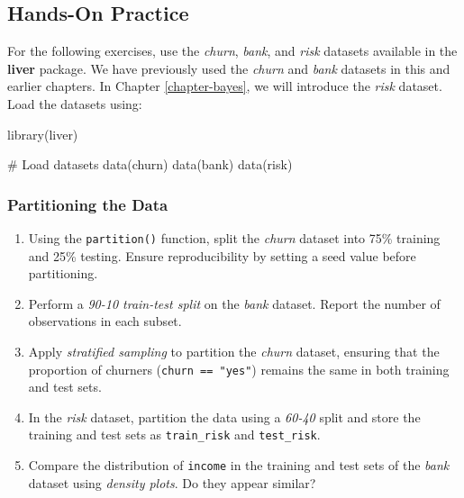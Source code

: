 \documentclass[
  11pt,
]{book}
\makeatletter
\newenvironment{Shaded}{}{}
\newcommand{\CommentTok}[1]{\textcolor[rgb]{0.36,0.36,0.36}{#1}}
\newcommand{\FunctionTok}[1]{#1}
\newcommand{\NormalTok}[1]{#1}
\newenvironment{kframe}{%
\medskip{}
\setlength{\fboxsep}{.8em}
 \def\at@end@of@kframe{}%
 \ifinner\ifhmode%
  \def\at@end@of@kframe{\end{minipage}}%
  \begin{minipage}{\columnwidth}%
 \fi\fi%
 \def\FrameCommand##1{\hskip\@totalleftmargin \hskip-\fboxsep
 \colorbox{shadecolor}{##1}\hskip-\fboxsep
     \hskip-\linewidth \hskip-\@totalleftmargin \hskip\columnwidth}%
 \MakeFramed {\advance\hsize-\width
   \@totalleftmargin\z@ \linewidth\hsize
   \@setminipage}}%
 {\par\unskip\endMakeFramed%
 \at@end@of@kframe}
\renewenvironment{Shaded}{\begin{kframe}}{\end{kframe}}
\theoremstyle{definition}
\theoremstyle{definition}
\theoremstyle{definition}
\theoremstyle{definition}
\theoremstyle{remark}
\makeatother
\begin{document}
\subsection*{Hands-On Practice}\label{hands-on-practice}


For the following exercises, use the \emph{churn}, \emph{bank}, and \emph{risk} datasets available in the \textbf{liver} package. We have previously used the \emph{churn} and \emph{bank} datasets in this and earlier chapters. In Chapter \ref{chapter-bayes}, we will introduce the \emph{risk} dataset. Load the datasets using:

\begin{Shaded}
\begin{Highlighting}[]
\FunctionTok{library}\NormalTok{(liver)}

\CommentTok{\# Load datasets}
\FunctionTok{data}\NormalTok{(churn)}
\FunctionTok{data}\NormalTok{(bank)}
\FunctionTok{data}\NormalTok{(risk)}
\end{Highlighting}
\end{Shaded}

\subsubsection*{Partitioning the Data}\label{partitioning-the-data}


\begin{enumerate}
\def\labelenumi{\arabic{enumi}.}
\setcounter{enumi}{14}
\item
  Using the \texttt{partition()} function, split the \emph{churn} dataset into 75\% training and 25\% testing. Ensure reproducibility by setting a seed value before partitioning.
\item
  Perform a \emph{90-10 train-test split} on the \emph{bank} dataset. Report the number of observations in each subset.
\item
  Apply \emph{stratified sampling} to partition the \emph{churn} dataset, ensuring that the proportion of churners (\texttt{churn\ ==\ "yes"}) remains the same in both training and test sets.
\item
  In the \emph{risk} dataset, partition the data using a \emph{60-40} split and store the training and test sets as \texttt{train\_risk} and \texttt{test\_risk}.
\item
  Compare the distribution of \texttt{income} in the training and test sets of the \emph{bank} dataset using \emph{density plots}. Do they appear similar?
\end{enumerate}
\end{document}
